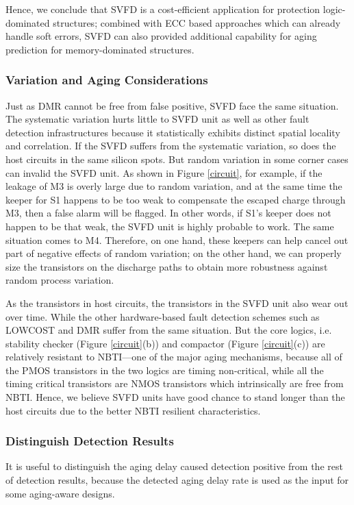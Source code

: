 Hence, we conclude that SVFD is a cost-efficient application for protection logic-dominated structures; combined with ECC based approaches which can already handle soft errors, SVFD can also provided additional capability for aging prediction for memory-dominated structures.

\subsubsection{Variation and Aging Considerations}
Just as DMR cannot be free from false positive, SVFD face the same situation. The systematic variation hurts little to SVFD unit as well as other fault detection infrastructures because it statistically exhibits distinct spatial locality and correlation. If the SVFD suffers from the systematic variation, so does the host circuits in the same silicon spots. But random variation in some corner cases can invalid the SVFD unit. As shown in Figure \ref{circuit}, for example, if the leakage of M3 is overly large due to random variation, and at the same time the keeper for S1 happens to be too weak to compensate the escaped charge through M3, then a false alarm will be flagged. In other words, if S1's keeper does not happen to be that weak, the SVFD unit is highly probable to work. The same situation comes to M4. Therefore, on one hand, these keepers can help cancel out part of negative effects of random variation; on the other hand, we can properly size the transistors on the discharge paths to obtain more robustness against random process variation.

As the transistors in host circuits, the transistors in the SVFD unit also wear out over time. While the other hardware-based fault detection schemes such as LOWCOST and DMR suffer from the same situation. But the core logics, i.e. stability checker (Figure \ref{circuit}(b)) and compactor (Figure \ref{circuit}(c)) are relatively resistant to NBTI---one of the major aging mechanisms, because all of the PMOS transistors in the two logics are timing non-critical, while all the timing critical transistors are NMOS transistors which intrinsically are free from NBTI. Hence, we believe SVFD units have good chance to stand longer than the host circuits due to the better NBTI resilient characteristics.



\subsubsection{Distinguish Detection Results}
It is useful to  distinguish the aging delay caused detection positive from the rest of detection results,  because the detected aging delay rate is used as the input for some aging-aware designs.

